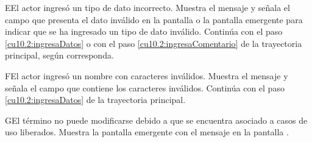 \begin{UCtrayectoriaA}{E}{El actor ingresó un tipo de dato incorrecto.}
    \UCpaso[\UCsist] Muestra el mensaje  y señala el campo que presenta el dato inválido en la 
    pantalla  o la pantalla emergente  para indicar que se ha ingresado un tipo de dato inválido.
    \UCpaso[] Continúa con el paso \ref{cu10.2:ingresaDatos} o con el paso \ref{cu10.2:ingresaComentario} de la trayectoria principal, según corresponda.
 \end{UCtrayectoriaA}
 
 \begin{UCtrayectoriaA}{F}{El actor ingresó un nombre con caracteres inválidos.}
    \UCpaso[\UCsist] Muestra el mensaje  y señala el campo que contiene los caracteres inválidos.
    \UCpaso[] Continúa con el paso \ref{cu10.2:ingresaDatos} de la trayectoria principal.
 \end{UCtrayectoriaA}
 \begin{UCtrayectoriaA}{G}{El término no puede modificarse debido a que se encuentra asociado a casos de uso liberados.}
    \UCpaso[\UCsist] Muestra la pantalla emergente con el mensaje  en la pantalla .
 \end{UCtrayectoriaA}
